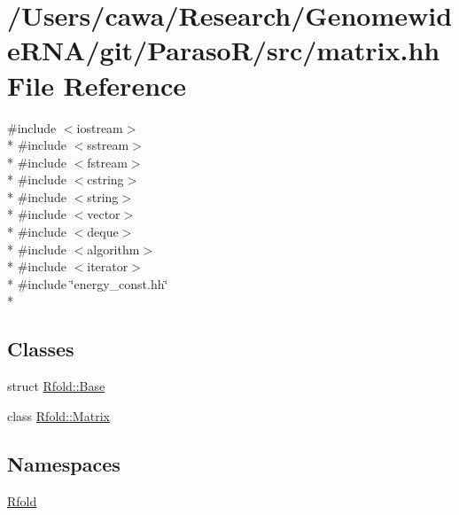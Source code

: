 \hypertarget{matrix_8hh}{\section{/\+Users/cawa/\+Research/\+Genomewide\+R\+N\+A/git/\+Paraso\+R/src/matrix.hh File Reference}
\label{matrix_8hh}
}
{\ttfamily \#include $<$iostream$>$}\\*
{\ttfamily \#include $<$sstream$>$}\\*
{\ttfamily \#include $<$fstream$>$}\\*
{\ttfamily \#include $<$cstring$>$}\\*
{\ttfamily \#include $<$string$>$}\\*
{\ttfamily \#include $<$vector$>$}\\*
{\ttfamily \#include $<$deque$>$}\\*
{\ttfamily \#include $<$algorithm$>$}\\*
{\ttfamily \#include $<$iterator$>$}\\*
{\ttfamily \#include \char`\"{}energy\+\_\+const.\+hh\char`\"{}}\\*
\subsection*{Classes}
\begin{DoxyCompactItemize}
\item 
struct \hyperlink{struct_rfold_1_1_base}{Rfold\+::\+Base}
\item 
class \hyperlink{class_rfold_1_1_matrix}{Rfold\+::\+Matrix}
\end{DoxyCompactItemize}
\subsection*{Namespaces}
\begin{DoxyCompactItemize}
\item 
 \hyperlink{namespace_rfold}{Rfold}
\end{DoxyCompactItemize}
